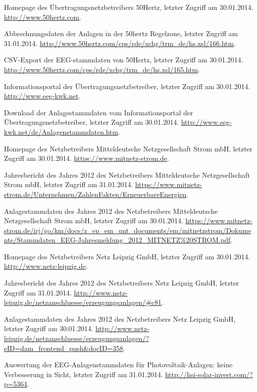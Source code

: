 \documentclass[a4paper,11pt]{article}
\begin{document}

\begin{thebibliography}{10}

 Homepage des Übertragungsnetzbetreibers 50Hertz, letzter
  Zugriff am 30.01.2014.  \newblock \url{http://www.50hertz.com}.

 Abbrechnungsdaten der Anlagen in der 50hertz
  Regelzone, letzter Zugriff am 31.01.2014.  \newblock
  \url{http://www.50hertz.com/cps/rde/xchg/trm_de/hs.xsl/166.htm}.

 {CSV}-{E}xport der {EEG}-stammdaten von
  50{H}ertz, letzter Zugriff am 30.01.2014.  \newblock
  \url{http://www.50hertz.com/cps/rde/xchg/trm_de/hs.xsl/165.htm}.

 {I}nformationsportal der {Ü}bertragungsnetzbetreiber, letzter
  Zugriff am 30.01.2014.  \newblock \url{http://www.eeg-kwk.net}.

 {D}ownload der {A}nlagestammdaten vom
  {I}nformationsportal der {Ü}bertragungsnetzbetreiber, letzter Zugriff am
  30.01.2014.  \newblock
  \url{http://www.eeg-kwk.net/de/Anlagenstammdaten.htm}.

 {H}omepage des {N}etzbetreibers {M}itteldeutsche
  {N}etzgesellschaft {S}trom mb{H}, letzter Zugriff am 30.01.2014.  \newblock
  \url{https://www.mitnetz-strom.de}.

 {J}ahresbericht des {J}ahres 2012 des
  {N}etzbetreibers {M}itteldeutsche {N}etzgesellschaft {S}trom mb{H}, letzter
  Zugriff am 31.01.2014.  \newblock
  \url{https://www.mitnetz-strom.de/Unternehmen/ZahlenFakten/ErneuerbareEnergien}.

 {A}nlagestammdaten des {J}ahres 2012 des
  {N}etzbetreibers {M}itteldeutsche {N}etzgesellschaft {S}trom mb{H}, letzter
  Zugriff am 30.01.2014.  \newblock
  \url{https://www.mitnetz-strom.de/irj/go/km/docs/z_ep_em_unt_documents/em/mitnetzstrom/Dokumente/Stammdaten_EEG-Jahresmeldung_2012_MITNETZ%20STROM.pdf}.

 {H}omepage des {N}etzbetreibers {N}etz {L}eipzig {G}mb{H},
  letzter Zugriff am 30.01.2014.  \newblock \url{http://www.netz-leipzig.de}.

 {J}ahresbericht des {J}ahres 2012 des
  {N}etzbetreibers {N}etz {L}eipzig {G}mb{H}, letzter Zugriff am 31.01.2014.
  \newblock
  \url{http://www.netz-leipzig.de/netzanschluesse/erzeugungsanlagen/#c81}.

 {A}nlagestammdaten des {J}ahres 2012 des
  {N}etzbetreibers {N}etz {L}eipzig {G}mb{H}, letzter Zugriff am 30.01.2014.
  \newblock
  \url{http://www.netz-leipzig.de/netzanschluesse/erzeugungsanlagen/?eID=dam_frontend_push&docID=358}.

 {A}uswertung der {EEG}-{A}nlagenstammdaten für
  {P}hotovoltaik-{A}nlagen: keine {V}erbesserung in {S}icht, letzter Zugriff
  am 31.01.2014.  \newblock \url{http://hsi-solar-invest.com/?p=5364}.

\end{thebibliography}
\end{document}
